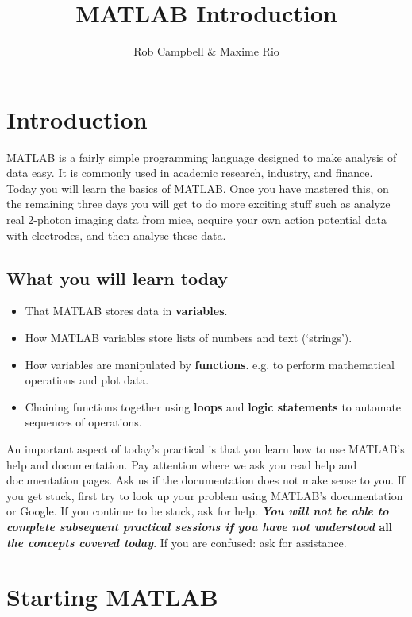 \documentclass{article}
\title{MATLAB Introduction}
\author{Rob Campbell \& Maxime Rio}
\date{}
\begin{document}
\maketitle


\section*{Introduction}

MATLAB is a fairly simple programming language designed to make analysis of data easy.
It is commonly used in academic research, industry, and finance.
Today you will learn the basics of MATLAB. 
Once you have mastered this, on the remaining three days you will get to do more exciting stuff such as analyze real 2-photon imaging data from mice, acquire your own action potential data with electrodes, and then analyse these data.


\subsection*{What you will learn today}
\begin{itemize}
\item That MATLAB stores data in \textbf{variables}.
\item How MATLAB variables store lists of numbers and text (`strings').
\item How variables are manipulated by \textbf{functions}. e.g. to perform mathematical operations and plot data. 
\item Chaining functions together using \textbf{loops} and \textbf{logic statements} to automate sequences of operations.
\end{itemize}

An important aspect of today's practical is that you learn how to use MATLAB's help and documentation.
Pay attention where we ask you read help and documentation pages. Ask us if the documentation does not make sense to you.
If you get stuck, first try to look up your problem using MATLAB's documentation or Google. 
If you continue to be stuck, ask for help.
\textbf{\textit{You will not be able to complete subsequent practical sessions if you have not understood} all \textit{the concepts covered today}}. 
If you are confused: ask for assistance.

\pagebreak
\section{Starting MATLAB}
\end{document}

